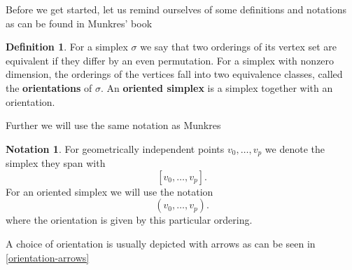 \documentclass[toc=bib]{scrartcl}
\theoremstyle{plain}
\theoremstyle{definition}
\newtheorem	{definition}[theorem]{Definition}
\newtheorem{notation}[theorem]{Notation}
\theoremstyle{remark}
\begin{document}
Before we get started, let us remind ourselves of some definitions and notations as can be found in Munkres' book \cite[p. 26f.]{mu}
\begin{definition}
	For a simplex $\sigma$ we say that two orderings of its vertex set are equivalent if they differ by an even permutation. For a simplex with nonzero dimension, the orderings of the vertices fall into two equivalence classes, called the \textbf{orientations} of $\sigma$. An \textbf{oriented simplex} is a simplex together with an orientation.
\end{definition}
Further we will use the same notation as Munkres \cite[p. 26]{mu}
\begin{notation}
	For geometrically independent points $v_0,\dots,v_p$ we denote the simplex they span with
	\[
	[v_0,\dots,v_p].
	\]
	For an oriented simplex we will use the notation
	\[
	(v_0,\dots,v_p).
	\]
	where the orientation is given by this particular ordering.
\end{notation}

A choice of orientation is usually depicted with arrows as can be seen in \autoref{orientation-arrows}
\end{document}
